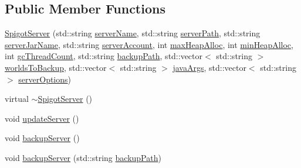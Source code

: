\subsection*{Public Member Functions}
\begin{DoxyCompactItemize}
\item 
\hyperlink{class_minecraft_server_service_1_1_spigot_server_aea28f0f9e617a15a29d4423844196d21}{Spigot\+Server} (std\+::string \hyperlink{class_minecraft_server_service_1_1_spigot_server_accad32ff846a3e4123749a83a2735a39}{server\+Name}, std\+::string \hyperlink{class_minecraft_server_service_1_1_spigot_server_a76f6b550b7fe37a3182e9bc72087a5dc}{server\+Path}, std\+::string \hyperlink{class_minecraft_server_service_1_1_spigot_server_a603128a2f6ce44b71ee74b601f1a24e0}{server\+Jar\+Name}, std\+::string \hyperlink{class_minecraft_server_service_1_1_spigot_server_a7d824cedf0faf1a5dcc6e4ab54d9443b}{server\+Account}, int \hyperlink{class_minecraft_server_service_1_1_spigot_server_ad1d3f0158a2e3f2dd338837bccf25c6a}{max\+Heap\+Alloc}, int \hyperlink{class_minecraft_server_service_1_1_spigot_server_a4ef50266a24dccd4f0d61d877567b55d}{min\+Heap\+Alloc}, int \hyperlink{class_minecraft_server_service_1_1_spigot_server_a057e5d3f9de3877edc7de6f3e5c40a6c}{gc\+Thread\+Count}, std\+::string \hyperlink{class_minecraft_server_service_1_1_spigot_server_a833bf01d9d4a495eda1a8052fdb8ee08}{backup\+Path}, std\+::vector$<$ std\+::string $>$ \hyperlink{class_minecraft_server_service_1_1_spigot_server_a4596e7ae4d2e1a7d2325fb13434f122a}{worlds\+To\+Backup}, std\+::vector$<$ std\+::string $>$ \hyperlink{class_minecraft_server_service_1_1_spigot_server_a3175de67475bf37b44a80575d4b3edfe}{java\+Args}, std\+::vector$<$ std\+::string $>$ \hyperlink{class_minecraft_server_service_1_1_spigot_server_a7a42f5a55caa07437cf121c2dfda60a0}{server\+Options})
\item 
virtual \hyperlink{class_minecraft_server_service_1_1_spigot_server_a54cecfac2a1b55f4f6044cb984359102}{$\sim$\+Spigot\+Server} ()
\item 
void \hyperlink{class_minecraft_server_service_1_1_spigot_server_a054ddb4477a413d22365ecae0321ae71}{update\+Server} ()
\item 
void \hyperlink{class_minecraft_server_service_1_1_spigot_server_ae210f6a553988cc2fa54cfa2f5740c49}{backup\+Server} ()
\item 
void \hyperlink{class_minecraft_server_service_1_1_spigot_server_a48055f2ec0703f54ac853d829f1cc077}{backup\+Server} (std\+::string \hyperlink{class_minecraft_server_service_1_1_spigot_server_a833bf01d9d4a495eda1a8052fdb8ee08}{backup\+Path})

\end{DoxyCompactItemize}
